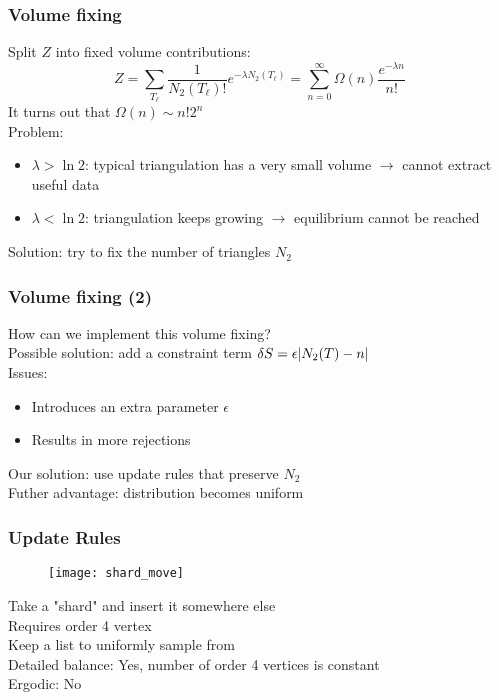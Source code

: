 
\begin{frame}
    \frametitle{Volume fixing}
    Split $Z$ into fixed volume contributions:
    \begin{equation}
        Z
        =
        \sum_{T_\ell} \frac{1}{N_2(T_\ell)!} e^{-\lambda N_2(T_\ell)}
        =
        \sum_{n = 0}^\infty \Omega(n) \frac{e^{-\lambda n}}{n!}
    \end{equation}
    It turns out that $\Omega(n) \sim n! 2^n$ \\
    Problem:
    \begin{itemize}
        \item $\lambda > \ln 2$: typical triangulation has a very small volume $\to$ cannot extract useful data
        \item $\lambda < \ln 2$: triangulation keeps growing $\to$ equilibrium cannot be reached
    \end{itemize}
    Solution: try to fix the number of triangles $N_2$
\end{frame}

\begin{frame}
    \frametitle{Volume fixing (2)}
    How can we implement this volume fixing? \\
    Possible solution: add a constraint term $\delta S = \epsilon \abs{N_2(T) - n}$ \\
    Issues:
    \begin{itemize}
        \item Introduces an extra parameter $\epsilon$
        \item Results in more rejections
    \end{itemize}
    Our solution: use update rules that preserve $N_2$ \\
    Futher advantage: distribution becomes uniform
\end{frame}

\begin{frame}
    \frametitle{Update Rules}
    \begin{figure}
        \centering
        \texttt{[image: shard\_move]}
    \end{figure}
    Take a "shard" and insert it somewhere else \\
    Requires order 4 vertex \\
    Keep a list to uniformly sample from \\
    Detailed balance: Yes, number of order 4 vertices is constant \\
    Ergodic: No
\end{frame}

